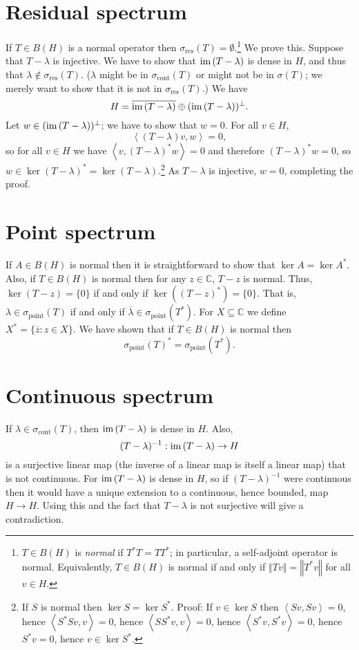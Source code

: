 \documentclass{article}
\newcommand{\inner}[2]{\left\langle #1, #2 \right\rangle}
\newcommand{\im}{\textrm{im\,}}
\newcommand{\point}{\sigma_{\textrm{point}}}
\newcommand{\cont}{\sigma_{\textrm{cont}}}
\newcommand{\residual}{\sigma_{\textrm{res}}}
\newcommand{\norm}[1]{\left\Vert #1 \right\Vert}
\begin{document}
\section{Residual spectrum}
If $T \in B(H)$ is a normal operator then $\residual(T) = \emptyset$.\footnote{$T \in B(H)$ is {\em normal} if
$T^*T=TT^*$; in particular, a self-adjoint operator is normal. Equivalently, $T \in B(H)$ is normal if and only if
$\norm{Tv}=\norm{T^*v}$ for all $v \in H$.} We prove this. Suppose that
$T-\lambda$ is injective. We have to show that $\im (T-\lambda)$ is dense in $H$, and thus that $\lambda \not \in
\residual(T)$. ($\lambda$ might be in $\cont(T)$ or might not be in $\sigma(T)$;  we merely want to show that it is not
in $\residual(T)$.) We have
\[
H=\overline{ \im(T-\lambda)} \oplus (\im(T-\lambda))^\perp.
\]
Let $w \in (\im(T-\lambda))^\perp$; we have to show that $w=0$. For all $v \in H$,
\[
\inner{(T-\lambda)v}{w}=0,
\]
so for all $v \in H$ we have $\inner{v}{(T-\lambda)^*w}=0$ and therefore
$(T-\lambda)^*w=0$, so $w \in \ker (T-\lambda)^*=\ker(T-\lambda)$.\footnote{If $S$ is normal then
$\ker S=\ker S^*$. Proof: If $v \in \ker S$ then $\inner{Sv}{Sv}=0$, hence $\inner{S^*Sv}{v}=0$, hence
$\inner{SS^*v}{v}=0$, hence $\inner{S^*v}{S^*v}=0$, hence $S^*v=0$, hence $v \in \ker S^*$.}
 As $T-\lambda$ is injective, $w=0$, completing the proof.

\section{Point spectrum}
If $A \in B(H)$ is normal then it is straightforward to show
that $\ker A=\ker A^*$. Also, if $T \in B(H)$ is normal then for any $z \in \mathbb{C}$, $T-z$ is normal.
Thus, $\ker (T-z) = \{0\}$ if and only if $\ker ((T-z)^*)=\{0\}$. That is, $\lambda \in \point(T)$ if and only
if $\overline{\lambda} \in \point(T^*)$. 
For $X \subseteq \mathbb{C}$ we define
$X^*=\{\overline{z}:z \in X\}$. We have shown that if $T \in B(H)$ is normal then
\[
\point(T)^* = \point(T^*).
\]


\section{Continuous spectrum}
If $\lambda \in \cont(T)$, then $\im(T-\lambda)$ is dense in $H$. Also,
\[
(T-\lambda)^{-1}:\im(T-\lambda) \to H
\]
is a surjective linear map (the inverse of a linear map is itself a linear map) that is not continuous. For $\im(T-\lambda)$ is dense in $H$,
so if $(T-\lambda)^{-1}$ were continuous then it would
have a unique extension to a continuous, hence bounded, map $H \to H$. Using this and the fact that
$T-\lambda$ is not surjective will give a contradiction.
\end{document}
